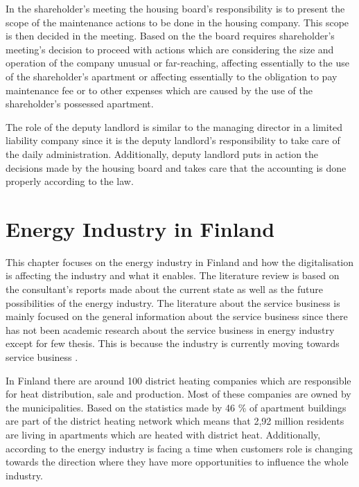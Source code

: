 In the shareholder's meeting the housing board's responsibility is to present the scope of the maintenance actions to be done in the housing company. This scope is then decided in the meeting. \parencite{RantanenViiala:2015} Based on the \textcite{LLHA:2} the board requires shareholder's meeting's decision to proceed with actions which are considering the size and operation of the company unusual or far-reaching, affecting essentially to the use of the shareholder's apartment or affecting essentially to the obligation to pay maintenance fee or to other expenses which are caused by the use of the shareholder's possessed apartment.

The role of the deputy landlord is similar to the managing director in a limited liability company since it is the deputy landlord's responsibility to take care of the daily administration.  Additionally, deputy landlord puts in action the decisions made by the housing board and takes care that the accounting is done properly according to the law. \parencite{Sarekoski:2015}

\section{Energy Industry in Finland}

This chapter focuses on the energy industry in Finland and how the digitalisation is affecting the industry and what it enables. The literature review is based on the consultant's reports made about the current state as well as the future possibilities of the energy industry. The literature about the service business is mainly focused on the general information about the service business since there has not been academic research about the service business in energy industry except for few thesis. This is because the industry is currently moving towards service business \parencite{Energyindustry:2019}. 

In Finland there are around 100 district heating companies which are responsible for heat distribution, sale and production. Most of these companies are owned by the municipalities. \parencite{Energyindustry:2019,Poyry:2018} Based on the statistics made by \textcite{Energyindustrygraphs:2018} 46 \% of apartment buildings are part of the district heating network which means that 2,92 million residents are living in apartments which are heated with district heat. Additionally, according to the \textcite{Energiateollisuus:2018} energy industry is facing a time when customers role is changing towards the direction where they have more opportunities to influence the whole industry.

